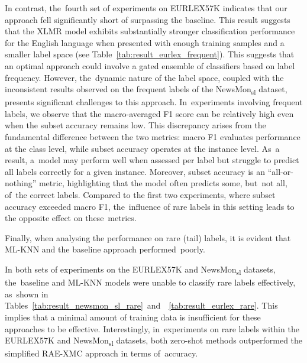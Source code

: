 \documentclass[make,article,accept,pdftex,moreauthors]{Definitions/mdpi}
\begin{document}
In contrast, the~fourth set of experiments on EURLEX57K indicates that our approach fell significantly short of surpassing the baseline. 
This result suggests that the XLMR model exhibits substantially stronger classification performance for the English language when presented with enough training samples and a smaller label space (see Table~\ref{tab:result_eurlex_frequent}). This suggests that an optimal approach could involve a gated ensemble of classifiers based on label frequency. However, the~dynamic nature of the label space, coupled with the inconsistent results observed on the frequent labels of the NewsMon\textsubscript{sl} dataset, presents significant challenges to this approach. In~experiments involving frequent labels, we observe that the macro-averaged F1 score can be relatively high even when the subset accuracy remains low. This discrepancy arises from the fundamental difference between the two metrics: macro F1 evaluates performance at the class level, while subset accuracy operates at the instance level. As~a result, a~model may perform well when assessed per label but struggle to predict all labels correctly for a given instance. Moreover, subset accuracy is an ``all-or-nothing'' metric, highlighting that the model often predicts some, but~not all, of~the correct labels. Compared to the first two experiments, where subset accuracy exceeded macro F1, the~influence of rare labels in this setting leads to the opposite effect on these~metrics.

Finally, when analysing the performance on rare (tail) labels, it is evident that ML-KNN and the baseline approach performed~poorly.


In both sets of experiments on the EURLEX57K and NewsMon\textsubscript{sl} datasets, the~baseline and ML-KNN models were unable to classify rare labels effectively, as~shown in \mbox{Tables~\ref{tab:result_newsmon_sl_rare} and ~\ref{tab:result_eurlex_rare}.}
This implies that a minimal amount of training data is insufficient for these approaches to be effective.
Interestingly, in~experiments on rare labels within the EURLEX57K and NewsMon\textsubscript{sl} datasets, both zero-shot methods outperformed the simplified RAE-XMC approach in terms of~accuracy.
\end{document}
